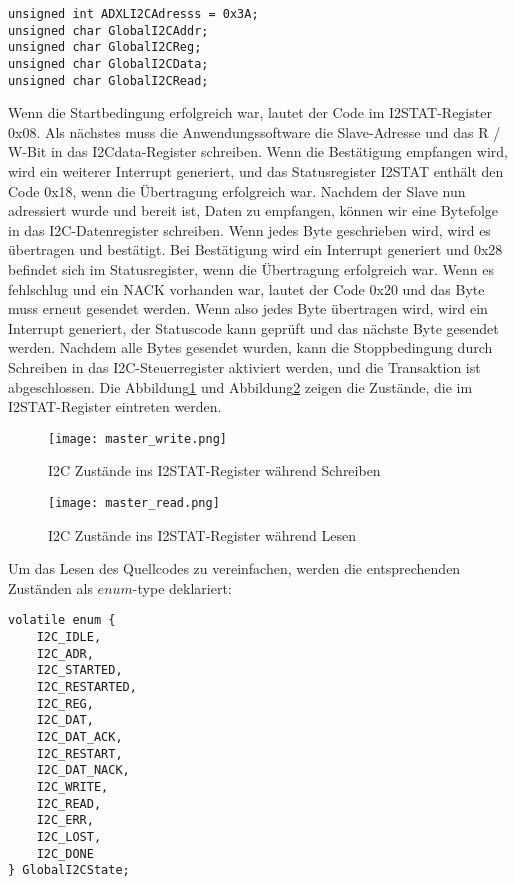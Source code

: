 \begin{lstlisting}
unsigned int ADXLI2CAdresss = 0x3A;
unsigned char GlobalI2CAddr;
unsigned char GlobalI2CReg;
unsigned char GlobalI2CData;
unsigned char GlobalI2CRead;
\end{lstlisting}

Wenn die Startbedingung erfolgreich war, lautet der Code im I2STAT-Register 0x08. Als nächstes muss die Anwendungssoftware die Slave-Adresse und das R / W-Bit in das I2Cdata-Register schreiben. Wenn die Bestätigung empfangen wird, wird ein weiterer Interrupt generiert, und das Statusregister I2STAT enthält den Code 0x18, wenn die Übertragung erfolgreich war. Nachdem der Slave nun adressiert wurde und bereit ist, Daten zu empfangen, können wir eine Bytefolge in das I2C-Datenregister schreiben. Wenn jedes Byte geschrieben wird, wird es übertragen und bestätigt. Bei Bestätigung wird ein Interrupt generiert und 0x28 befindet sich im Statusregister, wenn die Übertragung erfolgreich war. Wenn es fehlschlug und ein NACK vorhanden war, lautet der Code 0x20 und das Byte muss erneut gesendet werden. Wenn also jedes Byte übertragen wird, wird ein Interrupt generiert, der Statuscode kann geprüft und das nächste Byte gesendet werden. Nachdem alle Bytes gesendet wurden, kann die Stoppbedingung durch Schreiben in das I2C-Steuerregister aktiviert werden, und die Transaktion ist abgeschlossen. Die Abbildung\ref{fig:master_write} und  Abbildung\ref{fig:master_read} zeigen die Zustände, die im I2STAT-Register eintreten werden.

\begin{figure}[!ht]
	\centering
	\texttt{[image: master\_write.png]}
	\caption[I2STAT-Register während Schreiben]{I2C Zustände ins I2STAT-Register während Schreiben}
	\label{fig:master_write}
\end{figure}
\begin{figure}[!ht]
	\centering
	\texttt{[image: master\_read.png]}
	\caption[I2STAT-Register während Lesen]{I2C Zustände ins I2STAT-Register während Lesen}
	\label{fig:master_read}
\end{figure}
\clearpage

Um das Lesen des Quellcodes zu vereinfachen, werden die entsprechenden Zuständen als $enum$-type deklariert:
\begin{lstlisting}
volatile enum {
	I2C_IDLE,
	I2C_ADR,
	I2C_STARTED,
	I2C_RESTARTED,
	I2C_REG,
	I2C_DAT,
	I2C_DAT_ACK,
	I2C_RESTART,
	I2C_DAT_NACK,
	I2C_WRITE,
	I2C_READ,
	I2C_ERR,
	I2C_LOST,
	I2C_DONE
} GlobalI2CState;
\end{lstlisting}

